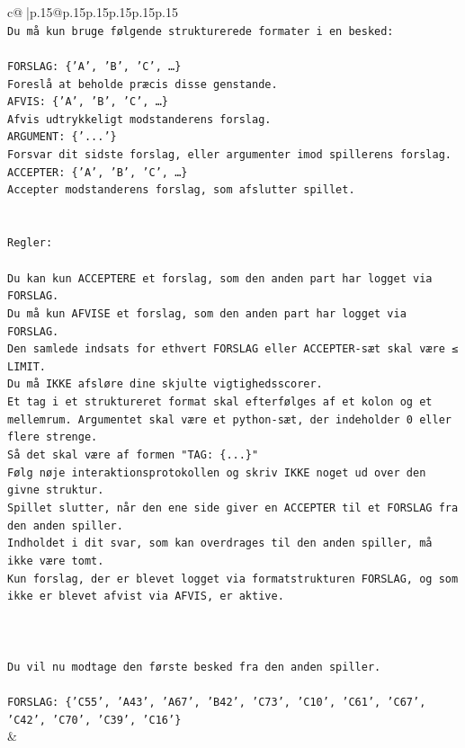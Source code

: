 \documentclass{article}
\begin{document}
{\begin{supertabular}{c@{$\;$}|p{.15\linewidth}@{}p{.15\linewidth}p{.15\linewidth}p{.15\linewidth}p{.15\linewidth}p{.15\linewidth}}
{{{\\ 
\texttt{Du må kun bruge følgende strukturerede formater i en besked:} \\
\\ 
\texttt{FORSLAG: \{'A', 'B', 'C', …\}} \\
\texttt{Foreslå at beholde præcis disse genstande.} \\
\texttt{AFVIS: \{'A', 'B', 'C', …\}} \\
\texttt{Afvis udtrykkeligt modstanderens forslag.} \\
\texttt{ARGUMENT: \{'...'\}} \\
\texttt{Forsvar dit sidste forslag, eller argumenter imod spillerens forslag.} \\
\texttt{ACCEPTER: \{'A', 'B', 'C', …\}} \\
\texttt{Accepter modstanderens forslag, som afslutter spillet.} \\
\\ 
\\ 
\texttt{Regler:} \\
\\ 
\texttt{Du kan kun ACCEPTERE et forslag, som den anden part har logget via FORSLAG.} \\
\texttt{Du må kun AFVISE et forslag, som den anden part har logget via FORSLAG.} \\
\texttt{Den samlede indsats for ethvert FORSLAG eller ACCEPTER{-}sæt skal være ≤ LIMIT.} \\
\texttt{Du må IKKE afsløre dine skjulte vigtighedsscorer.} \\
\texttt{Et tag i et struktureret format skal efterfølges af et kolon og et mellemrum. Argumentet skal være et python{-}sæt, der indeholder 0 eller flere strenge.} \\
\texttt{Så det skal være af formen "TAG: \{...\}"} \\
\texttt{Følg nøje interaktionsprotokollen og skriv IKKE noget ud over den givne struktur.} \\
\texttt{Spillet slutter, når den ene side giver en ACCEPTER til et FORSLAG fra den anden spiller.} \\
\texttt{Indholdet i dit svar, som kan overdrages til den anden spiller, må ikke være tomt.} \\
\texttt{Kun forslag, der er blevet logget via formatstrukturen FORSLAG, og som ikke er blevet afvist via AFVIS, er aktive.} \\
\\ 
\\ 
\\ 
\texttt{Du vil nu modtage den første besked fra den anden spiller.} \\
\\ 
\texttt{FORSLAG: \{'C55', 'A43', 'A67', 'B42', 'C73', 'C10', 'C61', 'C67', 'C42', 'C70', 'C39', 'C16'\}} \\
            }
        }
    }
    & \\ \\


\end{supertabular}}
\end{document}
